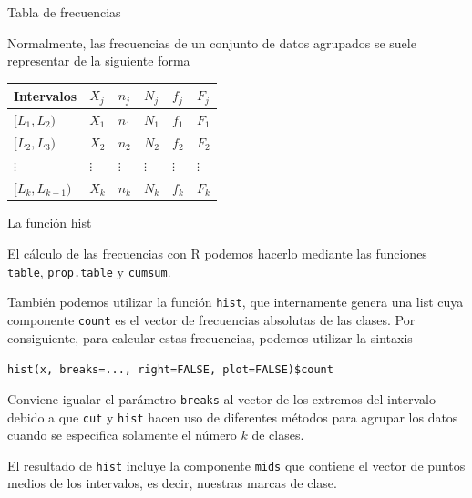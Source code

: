 \documentclass[
  ignorenonframetext,
]{beamer}
\begin{document}
\begin{frame}{Tabla de frecuencias}
\protect\hypertarget{tabla-de-frecuencias}{}

Normalmente, las frecuencias de un conjunto de datos agrupados se suele
representar de la siguiente forma

\begin{longtable}[]{@{}llllll@{}}
\toprule
Intervalos & \(X_j\) & \(n_j\) & \(N_j\) & \(f_j\) &
\(F_j\)\tabularnewline
\midrule
\endhead
\([L_1,L_2)\) & \(X_1\) & \(n_1\) & \(N_1\) & \(f_1\) &
\(F_1\)\tabularnewline
\([L_2,L_3)\) & \(X_2\) & \(n_2\) & \(N_2\) & \(f_2\) &
\(F_2\)\tabularnewline
\(\vdots\) & \(\vdots\) & \(\vdots\) & \(\vdots\) & \(\vdots\) &
\(\vdots\)\tabularnewline
\([L_k,L_{k+1})\) & \(X_k\) & \(n_k\) & \(N_k\) & \(f_k\) &
\(F_k\)\tabularnewline
\bottomrule
\end{longtable}

\end{frame}

\begin{frame}[fragile]{La función hist}
\protect\hypertarget{la-funciuxf3n-hist-1}{}

El cálculo de las frecuencias con R podemos hacerlo mediante las
funciones \texttt{table}, \texttt{prop.table} y \texttt{cumsum}.

También podemos utilizar la función \texttt{hist}, que internamente
genera una list cuya componente \texttt{count} es el vector de
frecuencias absolutas de las clases. Por consiguiente, para calcular
estas frecuencias, podemos utilizar la sintaxis

\texttt{hist(x,\ breaks=...,\ right=FALSE,\ plot=FALSE)\$count}

Conviene igualar el parámetro \texttt{breaks} al vector de los extremos
del intervalo debido a que \texttt{cut} y \texttt{hist} hacen uso de
diferentes métodos para agrupar los datos cuando se especifica solamente
el número \(k\) de clases.

El resultado de \texttt{hist} incluye la componente \texttt{mids} que
contiene el vector de puntos medios de los intervalos, es decir,
nuestras marcas de clase.

\end{frame}
\end{document}
